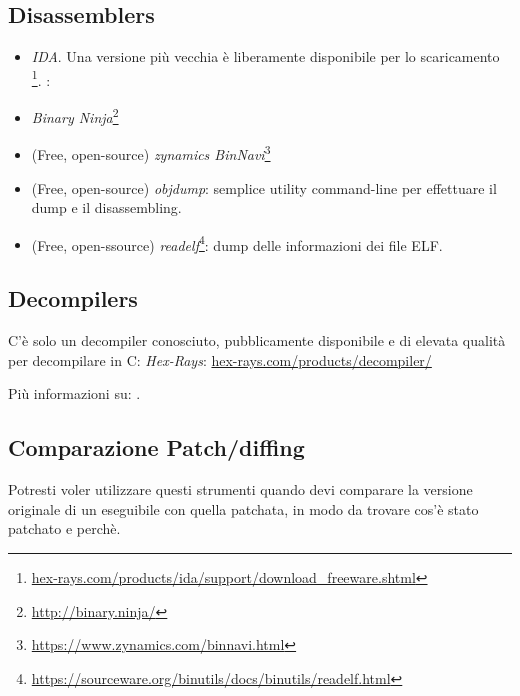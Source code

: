 \subsection{Disassemblers}


\begin{itemize}
\item \emph{IDA}. Una versione più vecchia è liberamente disponibile per lo scaricamento
\footnote{\href{http://go.yurichev.com/17031}{hex-rays.com/products/ida/support/download\_freeware.shtml}}.
\ShortHotKeyCheatsheet: 


\item \emph{Binary Ninja}\footnote{\url{http://binary.ninja/}}

\item (Free, open-source) \emph{zynamics BinNavi}\footnote{\url{https://www.zynamics.com/binnavi.html}}

\item (Free, open-source) \emph{objdump}: semplice utility command-line per effettuare il dump e il disassembling.

\item (Free, open-ssource) \emph{readelf}\footnote{\url{https://sourceware.org/binutils/docs/binutils/readelf.html}}:
dump delle informazioni dei file ELF.
\end{itemize}

\subsection{Decompilers}

C'è solo un decompiler conosciuto, pubblicamente disponibile e di elevata qualità per decompilare in C: \emph{Hex-Rays}:
\href{http://go.yurichev.com/17033}{hex-rays.com/products/decompiler/}

Più informazioni su: .

\subsection{Comparazione Patch/diffing}

Potresti voler utilizzare questi strumenti quando devi comparare la versione originale di un eseguibile con quella patchata,
in modo da trovare cos'è stato patchato e perchè.

